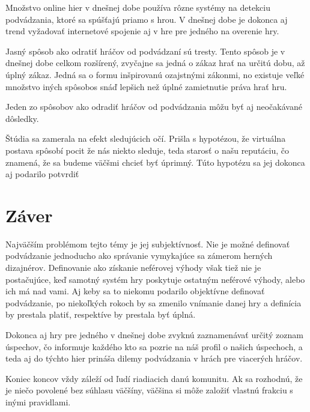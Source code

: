 \documentclass[10pt, oneside, slovak,a4paper]{article}
\begin{document}
Množstvo online hier v dnešnej dobe používa rôzne systémy na detekciu podvádzania, ktoré sa spúšťajú priamo s hrou. V dnešnej dobe je dokonca aj trend vyžadovať internetové spojenie aj v hre pre jedného na overenie hry.

Jasný spôsob ako odratiť hráčov od podvádzaní sú tresty. Tento spôsob je v dnešnej dobe celkom rozšírený, zvyčajne sa jedná o zákaz hrať na určitú dobu, až úplný zákaz. Jedná sa o formu inšpirovanú ozajstnými zákonmi, no existuje veľké množstvo iných spôsobos snáď lepšich než úplné zamietnutie práva hrať hru.

Jeden zo spôsobov ako odradiť hráčov od podvádzania môžu byť aj neočakávané dôsledky. 

Štúdia sa zamerala na efekt sledujúcich očí. Prišla s hypotézou, že virtuálna postava spôsobí pocit že nás niekto sleduje, teda starosť o našu reputáciu, čo znamená, že sa budeme väčšmi chcieť byť úprimný. \cite{not_alone} Túto hypotézu sa jej dokonca aj podarilo potvrdiť

\section{Záver} 

 Najväčším problémom tejto témy je jej subjektívnosť. Nie je možné definovať podvádzanie jednoducho ako správanie vymykajúce sa zámerom herných dizajnérov. Definovanie ako získanie neférovej výhody však tiež nie je postačujúce, keď samotný systém hry poskytuje ostatným neférové výhody, alebo ich má nad vami. Aj keby sa to niekomu podarilo objektívne definovať podvádzanie, po niekoľkých rokoch by sa zmenilo vnímanie danej hry a definícia by prestala platiť, respektíve by prestala byť úplná.

 Dokonca aj hry pre jedného v dnešnej dobe zvyknú zaznamenávať určitý zoznam úspechov, čo informuje každého kto sa pozrie na náš profil o našich úspechoch, a teda aj do týchto hier prináša dilemy podvádzania v hrách pre viacerých hráčov.

Koniec koncov vždy záleží od ľudí riadiacich danú komunitu. Ak sa rozhodnú, že je niečo povolené bez súhlasu väčšíny, väčšina si môže založiť vlastnú frakciu s inými pravidlami.



\nocite{*}


\end{document}
